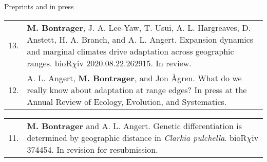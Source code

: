 \documentclass[letterpaper,11pt,oneside]{article}
\begin{document}






\noindent\Large{Preprints and in press} 
\normalsize
\bigskip

\def\arraystretch{1.2}
\noindent \begin{tabular}{@{} p{1cm} >{\raggedright\arraybackslash}p{15.11cm}}
13. & \textbf{M. Bontrager}, J. A. Lee-Yaw, T. Usui, A. L. Hargreaves, D. Anstett, H. A. Branch, and A. L. Angert. Expansion dynamics and marginal climates drive adaptation across geographic ranges. bioR$\chi$iv 2020.08.22.262915. In review. \\
12. & A. L. Angert, \textbf{M. Bontrager}, and Jon \AA gren. What do we really know about adaptation at range edges? In press at the Annual Review of Ecology, Evolution, and Systematics. \\
\end{tabular}

\def\arraystretch{1.2}
\noindent \begin{tabular}{@{} p{1cm} >{\raggedright\arraybackslash}p{15.11cm}}
11. & \textbf{M. Bontrager} and A. L. Angert. Genetic differentiation is determined by geographic distance in \textit{Clarkia pulchella}. bioR$\chi$iv 374454. In revision for resubmission. \\
\end{tabular}
\end{document}
